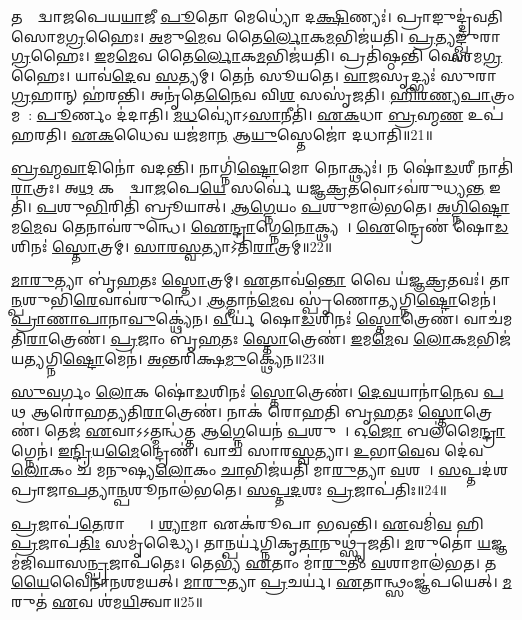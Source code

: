 𑌤𑌸𑍍𑌮𑌾᳚𑌦𑍍𑌵𑌾𑌜𑌪𑍇𑌯\ul{𑌯𑌾}𑌜𑍀 \ul{𑌪𑍂}𑌤𑍋 𑌮𑍇𑌧𑍍𑌯𑍋॑ 𑌦\ul{𑌕𑍍𑌷𑌿}𑌣𑍍𑌯𑌃॑।
𑌪𑍍𑌰𑌾𑌙𑍁𑌦𑍍𑌦𑍍𑌰॑𑌵𑌤𑌿 𑌸𑍋𑌮\ul{𑌗𑍍𑌰}𑌹𑍈𑌃।
\ul{𑌅}𑌮𑍁\ul{𑌮𑍇}𑌵 𑌤𑍈\ul{𑌰𑍍𑌲𑍋}𑌕\ul{𑌮}𑌭𑌿𑌜॑𑌯𑌤𑌿।
\ul{𑌪𑍍𑌰}𑌤𑍍𑌯𑌙𑍍𑌖𑍍𑌸𑍁॑𑌰𑌾\ul{𑌗𑍍𑌰}𑌹𑍈𑌃।
\ul{𑌇}𑌮\ul{𑌮𑍇}𑌵 𑌤𑍈\ul{𑌰𑍍𑌲𑍋}𑌕\ul{𑌮}𑌭𑌿𑌜॑𑌯𑌤𑌿।
𑌪𑍍𑌰𑌤𑌿॑\-𑌷𑍍𑌠𑌨𑍍𑌤𑌿 𑌸𑍋𑌮\ul{𑌗𑍍𑌰}𑌹𑍈𑌃।
𑌯𑌾𑌵॑\ul{𑌦𑍇}𑌵 \ul{𑌸}𑌤𑍍𑌯𑌮𑍍।
𑌤𑍇𑌨॑ 𑌸𑍂𑌯𑌤𑍇।
\ul{𑌵𑌾}\ul{𑌜}𑌸𑍃𑌦𑍍𑌭𑍍𑌯𑌃॑ 𑌸𑍁𑌰𑌾\ul{𑌗𑍍𑌰}𑌹𑌾𑌨𑍍 𑌹॑𑌰𑌨𑍍𑌤𑌿।
𑌅𑌨𑍃॑𑌤𑍇\ul{𑌨𑍈}𑌵 𑌵𑌿\ul{𑌶}\ul{} 𑌸𑌸𑍃॑𑌜𑌤𑌿।
\ul{𑌹𑌿}\ul{𑌰}\ul{𑌣𑍍𑌯}\ul{𑌪𑌾}𑌤𑍍𑌰𑌂 𑌮𑌧𑍋᳚: \ul{𑌪𑍂}𑌰𑍍𑌣𑌂 𑌦॑𑌦𑌾𑌤𑌿।
\ul{𑌮}\ul{𑌧}𑌵𑍍𑌯𑍋॑\-𑌽\ul{𑌸𑌾}𑌨𑍀𑌤𑌿॑।
\ul{𑌏}\ul{𑌕}𑌧𑌾 \ul{𑌬𑍍𑌰}𑌹𑍍𑌮\ul{𑌣} 𑌉𑌪॑ 𑌹𑌰𑌤𑌿।
\ul{𑌏}\ul{𑌕}𑌧𑍈𑌵 𑌯𑌜॑𑌮𑌾\ul{𑌨} 𑌆\ul{𑌯𑍁}𑌸𑍍𑌤𑍇𑌜𑍋॑ 𑌦𑌧𑌾𑌤𑌿॥21॥\anuvakamend[\ul{𑌆}𑌪𑍍𑌤𑍍𑌵𑌾\-𑌽𑌵॑𑌰𑍁\ul{𑌨𑍍𑌧𑍇} 𑌸𑍋\ul{𑌮𑌃} 𑌶𑌮॑\ul{𑌲𑌂} 𑌯𑌥𑍍𑌸𑍁\ul{𑌰𑌾} 𑌹𑍍𑌯॑𑌸𑍍𑌯𑍈\ul{𑌨𑌂} 𑌵𑍍𑌯𑌤𑌿॑𑌷𑌜\ul{𑌤𑌿} 𑌵𑍍𑌯𑌾𑌵॑𑌰𑍍𑌤𑌯𑌤𑌿 𑌸𑍃𑌜𑌤𑌿 \ul{𑌚}𑌤𑍍𑌵𑌾𑌰𑌿॑ 𑌚]

\ul{𑌬𑍍𑌰}\ul{𑌹𑍍𑌮}\ul{𑌵𑌾}𑌦𑌿𑌨𑍋॑ 𑌵𑌦𑌨𑍍𑌤𑌿।
𑌨𑌾𑌗𑍍𑌨𑌿॑\ul{𑌷𑍍𑌟𑍋}𑌮𑍋 𑌨𑍋𑌕𑍍𑌥𑍍𑌯𑌃॑।
𑌨 𑌷𑍋॑\ul{𑌡}𑌶𑍀 𑌨𑌾𑌤𑌿॑\ul{𑌰𑌾}𑌤𑍍𑌰𑌃।
𑌅\ul{𑌥} 𑌕𑌸𑍍𑌮𑌾᳚𑌦𑍍𑌵𑌾\ul{𑌜}𑌪𑍇\ul{𑌯𑍇} 𑌸𑌰𑍍𑌵𑍇॑ 𑌯𑌜𑍍𑌞\ul{𑌕𑍍𑌰}𑌤𑌵𑍋\-𑌽𑌵॑𑌰𑍁𑌧𑍍𑌯\ul{𑌨𑍍𑌤} 𑌇𑌤𑌿॑।
\ul{𑌪}𑌶𑍁\ul{𑌭𑌿}𑌰𑌿𑌤𑌿॑ 𑌬𑍍𑌰𑍂𑌯𑌾𑌤𑍍।
\ul{𑌆}\ul{𑌗𑍍𑌨𑍇}𑌯𑌂 \ul{𑌪}𑌶𑍁𑌮𑌾𑌲॑𑌭𑌤𑍇।
\ul{𑌅}\ul{𑌗𑍍𑌨𑌿}\ul{𑌷𑍍𑌟𑍋}𑌮\ul{𑌮𑍇}𑌵 𑌤𑍇𑌨𑌾𑌵॑𑌰𑍁𑌨𑍍𑌧𑍇।
\ul{𑌐}\ul{𑌨𑍍𑌦𑍍𑌰𑌾}𑌗𑍍𑌨𑍇\ul{𑌨𑍋}𑌕𑍍𑌥𑍍𑌯𑌮𑍍᳚।
\ul{𑌐}𑌨𑍍𑌦𑍍𑌰𑍇𑌣॑ 𑌷𑍋\ul{𑌡}𑌶𑌿𑌨𑌃॑ \ul{𑌸𑍍𑌤𑍋}𑌤𑍍𑌰𑌮𑍍।
\ul{𑌸𑌾}\ul{𑌰}\ul{𑌸𑍍𑌵}𑌤𑍍𑌯𑌾\-𑌽𑌤𑌿॑\ul{𑌰𑌾}𑌤𑍍𑌰𑌮𑍍॥22॥

\ul{𑌮𑌾}\ul{𑌰𑍁}𑌤𑍍𑌯𑌾 𑌬𑍃॑\ul{𑌹}𑌤𑌃 \ul{𑌸𑍍𑌤𑍋}𑌤𑍍𑌰𑌮𑍍।
\ul{𑌏}𑌤𑌾𑌵॑\ul{𑌨𑍍𑌤𑍋} 𑌵𑍈 𑌯॑𑌜𑍍𑌞\ul{𑌕𑍍𑌰}𑌤𑌵𑌃॑।
𑌤𑌾\ul{𑌨𑍍𑌪}𑌶𑍁𑌭𑌿॑\ul{𑌰𑍇}𑌵𑌾𑌵॑𑌰𑍁𑌨𑍍𑌧𑍇।
\ul{𑌆}𑌤𑍍𑌮𑌾𑌨॑\ul{𑌮𑍇}𑌵 𑌸𑍍𑌪𑍃॑𑌣𑍋𑌤𑍍𑌯𑌗𑍍𑌨𑌿\ul{𑌷𑍍𑌟𑍋}𑌮𑍇𑌨॑।
\ul{𑌪𑍍𑌰𑌾}\ul{𑌣𑌾}\ul{𑌪𑌾}𑌨𑌾\ul{𑌵𑍁}𑌕𑍍𑌥𑍍𑌯𑍇॑𑌨।
\ul{𑌵𑍀}𑌰𑍍𑌯॑ 𑌷𑍋\ul{𑌡}𑌶𑌿𑌨𑌃॑ \ul{𑌸𑍍𑌤𑍋}𑌤𑍍𑌰𑍇𑌣॑।
𑌵𑌾𑌚॑𑌮𑌤𑌿\ul{𑌰𑌾}𑌤𑍍𑌰𑍇𑌣॑।
\ul{𑌪𑍍𑌰}𑌜𑌾𑌂 𑌬𑍃॑\ul{𑌹}𑌤𑌃 \ul{𑌸𑍍𑌤𑍋}𑌤𑍍𑌰𑍇𑌣॑।
\ul{𑌇}𑌮\ul{𑌮𑍇}𑌵 \ul{𑌲𑍋}𑌕\ul{𑌮}𑌭𑌿𑌜॑𑌯𑌤𑍍𑌯𑌗𑍍𑌨𑌿\ul{𑌷𑍍𑌟𑍋}𑌮𑍇𑌨॑।
\ul{𑌅}𑌨𑍍𑌤𑌰𑌿॑𑌕𑍍𑌷\ul{𑌮𑍁}𑌕𑍍𑌥𑍍𑌯𑍇॑𑌨॥23॥

\ul{𑌸𑍁}\ul{𑌵}𑌰𑍍𑌗𑌂 \ul{𑌲𑍋}𑌕 𑌷𑍋॑\ul{𑌡}𑌶𑌿𑌨𑌃॑ \ul{𑌸𑍍𑌤𑍋}𑌤𑍍𑌰𑍇𑌣॑।
\ul{𑌦𑍇}\ul{𑌵}𑌯𑌾𑌨𑌾॑\ul{𑌨𑍇}𑌵 \ul{𑌪}𑌥 𑌆𑌰𑍋॑𑌹𑌤𑍍𑌯𑌤𑌿\ul{𑌰𑌾}𑌤𑍍𑌰𑍇𑌣॑।
𑌨𑌾𑌕॑ 𑌰𑍋𑌹𑌤𑌿 𑌬𑍃\ul{𑌹}𑌤𑌃 \ul{𑌸𑍍𑌤𑍋}𑌤𑍍𑌰𑍇𑌣॑।
𑌤𑍇𑌜॑ \ul{𑌏}𑌵𑌾𑌽𑌽𑌤𑍍𑌮𑌨𑍍𑌧॑𑌤𑍍𑌤 𑌆\ul{𑌗𑍍𑌨𑍇}𑌯𑍇𑌨॑ \ul{𑌪}𑌶𑍁𑌨𑌾᳚।
𑌓\ul{𑌜𑍋} 𑌬𑌲॑𑌮𑍈\ul{𑌨𑍍𑌦𑍍𑌰𑌾}𑌗𑍍𑌨𑍇𑌨॑।
\ul{𑌇}\ul{𑌨𑍍𑌦𑍍𑌰𑌿}𑌯\ul{𑌮𑍈}𑌨𑍍𑌦𑍍𑌰𑍇𑌣॑।
𑌵𑌾𑌚॑ 𑌸𑌾𑌰\ul{𑌸𑍍𑌵}𑌤𑍍𑌯𑌾।
\ul{𑌉}𑌭𑌾\ul{𑌵𑍇}𑌵 𑌦𑍇॑𑌵\ul{𑌲𑍋}𑌕𑌂 𑌚॑ 𑌮𑌨𑍁𑌷𑍍𑌯\ul{𑌲𑍋}𑌕𑌂 \ul{𑌚𑌾}𑌭𑌿𑌜॑𑌯𑌤𑌿 𑌮𑌾\ul{𑌰𑍁}𑌤𑍍𑌯𑌾 \ul{𑌵}𑌶𑌯𑌾᳚।
\ul{𑌸}𑌪𑍍𑌤𑌦॑𑌶 𑌪𑍍𑌰𑌾𑌜𑌾\ul{𑌪}𑌤𑍍𑌯𑌾\ul{𑌨𑍍𑌪}𑌶𑍂𑌨𑌾𑌲॑𑌭𑌤𑍇।
\ul{𑌸}\ul{𑌪𑍍𑌤}\ul{𑌦}𑌶𑌃 \ul{𑌪𑍍𑌰}𑌜𑌾𑌪॑𑌤𑌿𑌃॥24॥

\ul{𑌪𑍍𑌰}𑌜𑌾𑌪॑\ul{𑌤𑍇}𑌰𑌾𑌪𑍍𑌤𑍍𑌯𑍈᳚।
\ul{𑌶𑍍𑌯𑌾}𑌮𑌾 𑌏𑌕॑𑌰𑍂𑌪𑌾 𑌭𑌵𑌨𑍍𑌤𑌿।
\ul{𑌏}𑌵𑌮𑌿॑\ul{𑌵} 𑌹𑌿 \ul{𑌪𑍍𑌰}𑌜𑌾𑌪॑\ul{𑌤𑌿𑌃} 𑌸𑌮𑍃॑𑌦𑍍𑌧𑍍𑌯𑍈।
𑌤𑌾𑌨𑍍𑌪𑌰𑍍𑌯॑𑌗𑍍𑌨𑌿𑌕𑍃\ul{𑌤𑌾}𑌨𑍁𑌥𑍍𑌸𑍃॑𑌜𑌤𑌿।
\ul{𑌮}𑌰𑍁𑌤𑍋॑ \ul{𑌯}𑌜𑍍𑌞𑌮॑𑌜𑌿𑌘𑌾𑌸\ul{𑌨𑍍𑌪𑍍𑌰}𑌜𑌾𑌪॑𑌤𑍇𑌃।
𑌤𑍇𑌭𑍍𑌯॑ \ul{𑌏}𑌤𑌾𑌂 𑌮𑌾॑\ul{𑌰𑍁}𑌤𑍀𑌂 \ul{𑌵}𑌶𑌾𑌮𑌾𑌲॑𑌭𑌤।
𑌤\ul{𑌯𑍈}𑌵𑍈𑌨𑌾॑𑌨𑌶𑌮𑌯𑌤𑍍।
\ul{𑌮𑌾}\ul{𑌰𑍁}𑌤𑍍𑌯𑌾 \ul{𑌪𑍍𑌰}𑌚𑌰𑍍𑌯॑।
\ul{𑌏}𑌤𑌾𑌨𑍍𑌥𑍍𑌸𑌂𑌜𑍍𑌞॑𑌪𑌯𑍇𑌤𑍍।
\ul{𑌮}𑌰𑍁𑌤॑ \ul{𑌏}𑌵 𑌶॑𑌮\ul{𑌯𑌿}𑌤𑍍𑌵𑌾॥25॥

